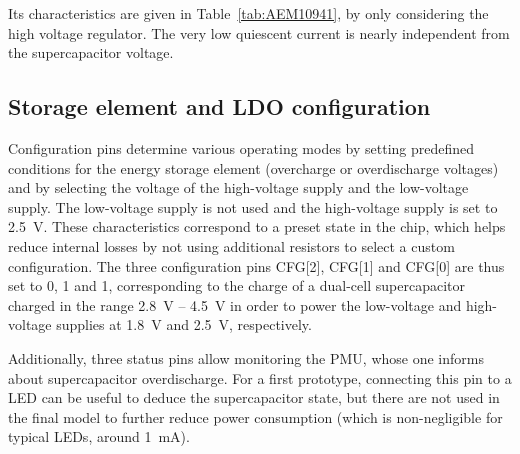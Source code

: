 \documentclass{EPL-master-thesis-covers-EN}
\begin{document}
Its characteristics are given in Table~\ref{tab:AEM10941}, by only considering the high voltage regulator. The very low quiescent current is nearly independent from the supercapacitor voltage.

\begin{table}[H]
\centering
{}
\caption{Characteristics of the AEM10941 PMU}
\label{tab:AEM10941}
\end{table}


\subsection*{Storage element and LDO configuration}

Configuration pins determine various operating modes by setting predefined conditions for the energy storage element (overcharge or overdischarge voltages) and by selecting the voltage of the high-voltage supply and the low-voltage supply.
The low-voltage supply is not used and the high-voltage supply is set to \SI{2.5}{V}. These characteristics correspond to a preset state in the chip, which helps reduce internal losses by not using additional resistors to select a custom configuration. The three configuration pins CFG[2], CFG[1] and CFG[0] are thus set to 0, 1 and 1, corresponding to the charge of a dual-cell supercapacitor charged in the range \SI{2.8}{V} -- \SI{4.5}{V} in order to power the low-voltage and high-voltage supplies at \SI{1.8}{V} and \SI{2.5}{V}, respectively.

Additionally, three status pins allow monitoring the PMU, whose one informs about supercapacitor overdischarge. For a first prototype, connecting this pin to a LED can be useful to deduce the supercapacitor state, but there are not used in the final model to further reduce power consumption (which is non-negligible for typical LEDs, around \SI{1}{mA}).
\end{document}
